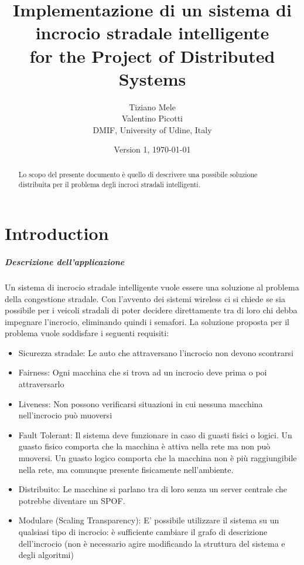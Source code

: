 \documentclass{memoir}
\title{Implementazione di un sistema di incrocio stradale intelligente \\ for the Project of Distributed Systems}
\author{Tiziano Mele\\Valentino Picotti\\DMIF, University of Udine, Italy}
\date{Version 1, \today}
\begin{document}
\maketitle
\begin{abstract}
  Lo scopo del presente documento è quello di descrivere una possibile soluzione
  distribuita per il problema degli incroci stradali intelligenti.
\end{abstract}

\chapter{Introduction}\label{ch:intro}

\paragraph{Descrizione dell'applicazione}


Un sistema di incrocio stradale intelligente vuole essere una soluzione al
problema della congestione stradale. Con l'avvento dei sistemi wireless ci si
chiede se sia possibile per i veicoli stradali di poter decidere direttamente
tra di loro chi debba impegnare l'incrocio, eliminando quindi i semafori. La
soluzione proposta per il problema vuole soddisfare i seguenti requisiti:
\begin{itemize}
\item Sicurezza stradale: Le auto che attraversano l'incrocio non devono scontrarsi
\item Fairness: Ogni macchina che si trova ad un incrocio deve prima o poi attraversarlo
\item Liveness: Non possono verificarsi situazioni in cui nessuna macchina
  nell'incrocio può muoversi
\item Fault Tolerant: Il sistema deve funzionare in caso di guasti fisici o
  logici. Un guasto fisico comporta che la macchina è attiva nella rete ma non
  può muoversi. Un guasto logico comporta che la macchina non è più
  raggiungibile nella rete, ma comunque presente fisicamente nell'ambiente.
\item Distribuito: Le macchine si parlano tra di loro senza un server centrale
  che potrebbe diventare un SPOF.
\item Modulare (Scaling Transparency): E' possibile utilizzare il sistema su un
  qualsiasi tipo di incrocio: è sufficiente cambiare il grafo di descrizione
  dell'incrocio (non è necessario agire modificando la struttura del sistema e
  degli algoritmi)
\end{itemize}
\end{document}
